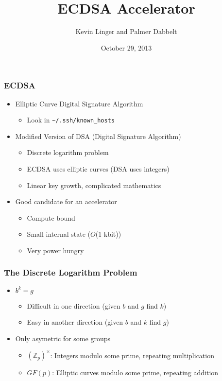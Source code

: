 \documentclass{beamer}
\title{ECDSA Accelerator}
\author{Kevin Linger and Palmer Dabbelt}
\date{October 29, 2013}
\begin{document}
\maketitle

\begin{frame}
  \frametitle{ECDSA}

  \begin{itemize}
  \item Elliptic Curve Digital Signature Algorithm
    \begin{itemize}
    \item Look in \texttt{\textasciitilde/.ssh/known\_hosts}
    \end{itemize}
  \item Modified Version of DSA (Digital Signature Algorithm)
    \begin{itemize}
    \item Discrete logarithm problem
    \item ECDSA uses elliptic curves (DSA uses integers)
    \item Linear key growth, complicated mathematics
    \end{itemize}
  \item Good candidate for an accelerator
    \begin{itemize}
      \item Compute bound
      \item Small internal state ($O$(1 kbit))
      \item Very power hungry
    \end{itemize}
  \end{itemize}
\end{frame}

\begin{frame}
  \frametitle{The Discrete Logarithm Problem}

  \begin{itemize}
  \item $b^k = g$
    \begin{itemize}
    \item Difficult in one direction (given $b$ and $g$ find $k$)
    \item Easy in another direction (given $b$ and $k$ find $g$)
    \end{itemize}
  \item Only asymetric for some groups
    \begin{itemize}
    \item $({\mathbb Z}_p)^\times$: Integers modulo some prime,
      repeating multiplication
    \item $GF(p)$: Elliptic curves modulo some prime, repeating
      addition
    \end{itemize}
  \end{itemize}
\end{frame}
\end{document}
